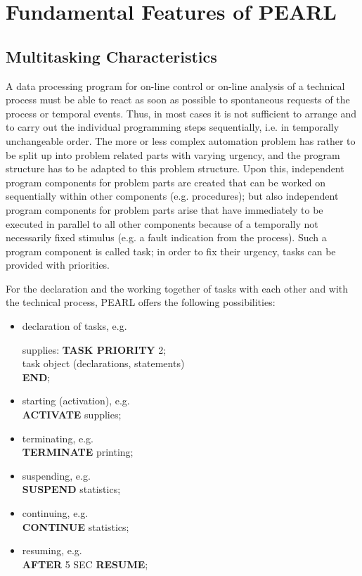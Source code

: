 \chapter{Fundamental Features of PEARL}   %

\section{Multitasking Characteristics} %


A data processing program for on-line control or on-line analysis of a
technical process must be able to react as soon as possible to
spontaneous requests of the process or temporal events. Thus, in most
cases it is not sufficient to arrange and to carry out the individual
programming steps sequentially, i.e. in temporally unchangeable order.
The more or less complex automation problem has rather to be split up into
problem related parts with varying urgency, and the program
structure has to be adapted to this problem structure. Upon this,
independent program components for problem parts are created that can be
worked on sequentially within other components (e.g. procedures);
but also independent program components for problem parts arise that
have immediately to be executed in parallel to all other components because
of a temporally not necessarily fixed stimulus (e.g. a fault indication
from the process). Such a program component is called
task; in order to fix their urgency, tasks can be provided with
priorities.

For the declaration and the working together of tasks with each other and
with the technical process, PEARL offers the following possibilities:

\begin{itemize}
\item declaration of tasks, e.g.\\
      \begin{tabbing}
      supplies: \= {\bf TASK PRIORITY} 2;\\
  \> task object (declarations, statements)\\
  \> {\bf END};\\
      \end{tabbing}
\item starting (activation), e.g.\\
      {\bf ACTIVATE} supplies;
\item terminating, e.g.\\
      {\bf TERMINATE} printing;
\item suspending, e.g.\\
      {\bf SUSPEND} statistics;
\item continuing, e.g.\\
      {\bf CONTINUE} statistics;
\item resuming, e.g.\\
      {\bf AFTER} 5 SEC {\bf RESUME};
\end{itemize}

